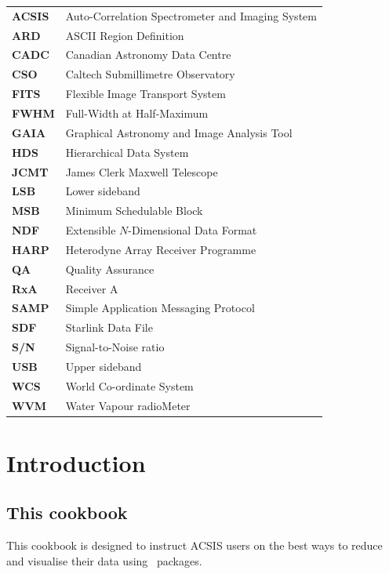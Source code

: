\documentclass[11pt,oneside,chapters]{starlink}
\begin{document}
\scfrontmatter

\Acronyms

\begin{table}[h!]
\begin{tabular}{ll}
\textbf{ACSIS}& Auto-Correlation Spectrometer and Imaging System\\
\textbf{ARD}& ASCII Region Definition\\
\textbf{CADC}& Canadian Astronomy Data Centre\\
\textbf{CSO}& Caltech Submillimetre Observatory\\
\textbf{FITS}& Flexible Image Transport System\\
\textbf{FWHM}& Full-Width at Half-Maximum\\
\textbf{GAIA}& Graphical Astronomy and Image Analysis Tool\\
\textbf{HDS}& Hierarchical Data System\\
\textbf{JCMT}& James Clerk Maxwell Telescope\\
\textbf{LSB}& Lower sideband\\
\textbf{MSB}& Minimum Schedulable Block\\
\textbf{NDF}& Extensible $N$-Dimensional Data Format\\
\textbf{HARP}& Heterodyne Array Receiver Programme\\
\textbf{QA}& Quality Assurance\\
\textbf{RxA}& Receiver A\\
\textbf{SAMP}& Simple Application Messaging Protocol\\
\textbf{SDF}& Starlink Data File\\
\textbf{S/N}& Signal-to-Noise ratio\\
\textbf{USB}& Upper sideband\\
\textbf{WCS}& World Co-ordinate System\\
\textbf{WVM}& Water Vapour radioMeter\\
\end{tabular}
\end{table}


\chapter{Introduction}
\label{sec:intro}

\section{This cookbook}
This cookbook is designed to instruct ACSIS users on the best ways to
reduce and visualise their data using \starlink\ packages.
\end{document}
